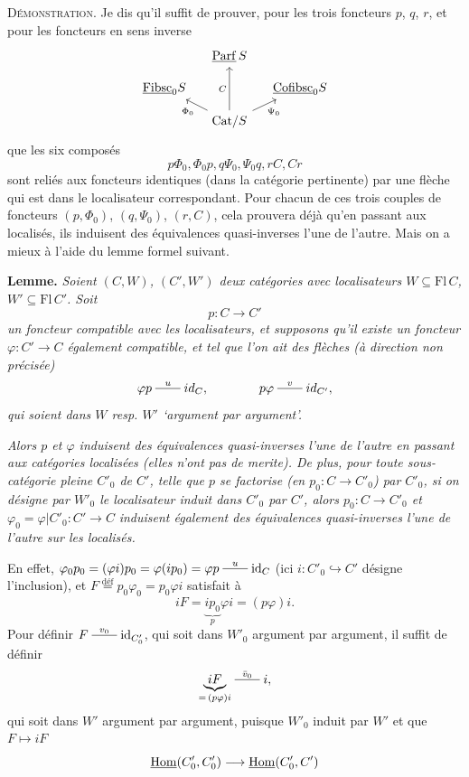 \textsc{Démonstration}. Je dis qu'il suffit de prouver, pour les trois foncteurs $p$, $q$, $r$, et pour les foncteurs en sens inverse
\[
\begin{tikzcd}[column sep=small, row sep=small]
 & \ul{Parf}\,S & \\
\ul{Fibsc}_0S & & \ul{Cofibsc}_0S \\
 & \mathrm{Cat}/S \arrow[uu, "C"] \arrow[ul, "\Phi_0"] \arrow[ur, "\Psi_0"'] &
\end{tikzcd}
\]
que les six composés
\[
p\Phi_0, \Phi_0p, q\Psi_0, \Psi_0q, rC, Cr
\]
sont reliés aux foncteurs identiques (dans la catégorie pertinente) par une flèche qui est dans le localisateur correspondant. Pour chacun de ces trois couples de foncteurs $(p,\Phi_0)$, $(q,\Psi_0)$, $(r,C)$, cela prouvera déjà qu'en passant aux localisés, ils induisent des équivalences quasi-inverses l'une de l'autre. Mais on a mieux à l'aide du lemme formel suivant.

\textbf{Lemme.} \textit{Soient $(C,W)$, $(C',W')$ deux catégories avec localisateurs $W \subseteq \mathrm{Fl}\,C$, $W' \subseteq \mathrm{Fl}\,C'$. Soit}
\[
p : C \longrightarrow C'
\]
\textit{un foncteur compatible avec les localisateurs, et supposons qu'il existe un foncteur $\varphi : C' \longrightarrow C$ également compatible, et tel que l'on ait des flèches (à direction non précisée)}
\[
\varphi p \xline{u} id_C, \qquad\qquad p\varphi \xline{v} id_{C'},
\]
\textit{qui soient dans $W$ resp. $W'$ `argument par argument'.}

\textit{Alors $p$ et $\varphi$ induisent des équivalences quasi-inverses l'une de l'autre en passant aux catégories localisées (elles n'ont pas de merite). De plus, pour toute sous-catégorie pleine $C'_0$ de $C'$, telle que $p$ se factorise (en $p_0 : C \longrightarrow C'_0$) par $C'_0$, si on désigne par $W'_0$ le localisateur induit dans $C'_0$ par $C'$, alors $p_0 : C \longrightarrow C'_0$ et $\varphi_0 = \varphi|C'_0 : C' \longrightarrow C$} \textit{induisent également des équivalences quasi-inverses l'une de l'autre sur les localisés.} %

En effet, $\varphi_0p_0 = (\varphi i)p_0 = \varphi(ip_0) = \varphi p \xline{u} \mathrm{id}_C$ (ici $i : C'_0 \hookrightarrow C'$ désigne l'inclusion), et $F \overset{\text{déf}}{=} p_0\varphi_0 = p_0\varphi i$ satisfait à
\[
iF = \underbrace{ip_0}_{p}\varphi i = (p\varphi)i.
\]
Pour définir $F \xline{v_0} \mathrm{id}_{C'_0}$, qui soit dans $W'_0$ argument par argument,
il suffit de définir
\[
\underbrace{iF}_{=\,(p\varphi)i} \xline{\bar v_0} i,
\]
qui soit dans $W'$ argument par argument, puisque $W'_0$ induit par $W'$ et que $F \longmapsto iF$
\[
\underline{\mathrm{Hom}}(C'_0,C'_0) \longrightarrow \underline{\mathrm{Hom}}(C'_0,C')
\]

